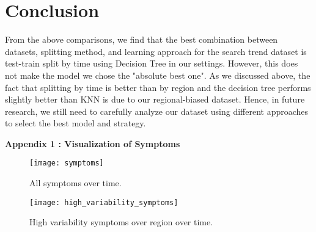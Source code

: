 \documentclass[12pt]{article}
\begin{document}
\section{Conclusion}
From the above comparisons, we find that the best combination between datasets, splitting method, and learning approach for the search trend dataset is test-train split by time using Decision Tree in our settings. However, this does not make the model we chose the "absolute best one". As we discussed above, the fact that splitting by time is better than by region and the decision tree performs slightly better than KNN is due to our regional-biased dataset.
Hence, in future research, we still need to carefully analyze our dataset using different approaches to select the best model and strategy.



 



\newpage
\large
\textbf{Appendix 1 : Visualization of Symptoms}
\begin{figure}[!htb]
    \centering
    \texttt{[image: symptoms]}
    \caption{All symptoms over time.}
\end{figure}

\begin{figure}[!htb]
    \centering
    \texttt{[image: high\_variability\_symptoms]}
    \caption{High variability symptoms over region over time.}
\end{figure}
\end{document}
